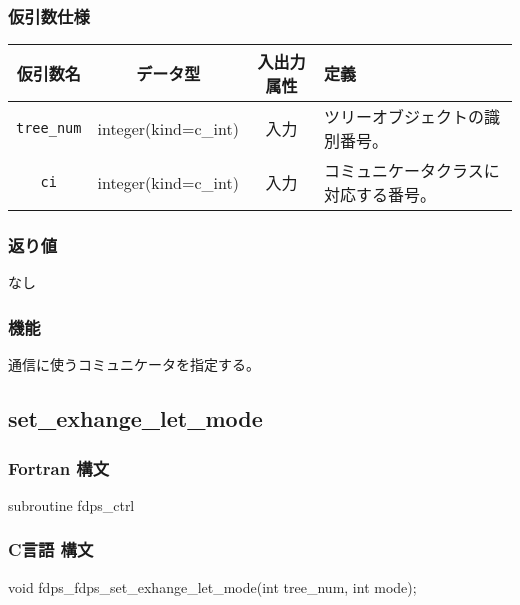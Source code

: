 \subsubsection*{仮引数仕様}
\begin{table}[h]
\begin{tabularx}{\linewidth}{cccX}
\toprule
\rowcolor{Snow2}
仮引数名 & データ型 & 入出力属性 & 定義 \\
\midrule
\verb|tree_num|  & integer(kind=c\_int)   & 入力     & ツリーオブジェクトの識別番号。\\
\texttt{ci} & integer(kind=c\_int) & 入力 & コミュニケータクラスに対応する番号。\\
\bottomrule
\end{tabularx}
\end{table}

\subsubsection*{返り値}
なし

\subsubsection*{機能}

通信に使うコミュニケータを指定する。 

\subsection{set\_exhange\_let\_mode}
\subsubsection*{Fortran 構文}
\begin{screen}
\begin{spverbatim}
subroutine fdps_ctrl%
\end{spverbatim}
\end{screen}

\subsubsection*{C言語 構文}
\begin{screen}
\begin{spverbatim}
void fdps_fdps_set_exhange_let_mode(int tree_num,
                                   int mode);
\end{spverbatim}
\end{screen}



